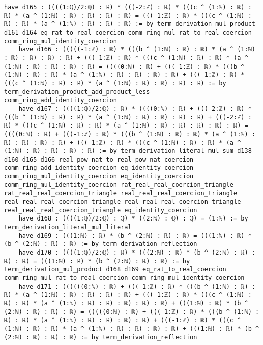 \documentclass{article}
\begin{document}
\begin{tcolorbox}[colback=white!10, width=\linewidth]
\begin{lstlisting}[language=Lean4]
    have d165 : ((((1:ℚ)/2:ℚ) : ℝ) * (((-2:ℤ) : ℝ) * (((c ^ (1:ℕ) : ℝ) : ℝ) * (a ^ (1:ℕ) : ℝ) : ℝ) : ℝ) : ℝ) = (((-1:ℤ) : ℝ) * (((c ^ (1:ℕ) : ℝ) : ℝ) * (a ^ (1:ℕ) : ℝ) : ℝ) : ℝ) := by term_derivation_mul_product d161 d164 eq_rat_to_real_coercion comm_ring_mul_rat_to_real_coercion comm_ring_mul_identity_coercion
    have d166 : (((((-1:ℤ) : ℝ) * (((b ^ (1:ℕ) : ℝ) : ℝ) * (a ^ (1:ℕ) : ℝ) : ℝ) : ℝ) : ℝ) + (((-1:ℤ) : ℝ) * (((c ^ (1:ℕ) : ℝ) : ℝ) * (a ^ (1:ℕ) : ℝ) : ℝ) : ℝ) : ℝ) = ((((0:ℕ) : ℝ) + (((-1:ℤ) : ℝ) * (((b ^ (1:ℕ) : ℝ) : ℝ) * (a ^ (1:ℕ) : ℝ) : ℝ) : ℝ) : ℝ) + (((-1:ℤ) : ℝ) * (((c ^ (1:ℕ) : ℝ) : ℝ) * (a ^ (1:ℕ) : ℝ) : ℝ) : ℝ) : ℝ) := by term_derivation_product_add_product_less comm_ring_add_identity_coercion
    have d167 : ((((1:ℚ)/2:ℚ) : ℝ) * ((((0:ℕ) : ℝ) + (((-2:ℤ) : ℝ) * (((b ^ (1:ℕ) : ℝ) : ℝ) * (a ^ (1:ℕ) : ℝ) : ℝ) : ℝ) : ℝ) + (((-2:ℤ) : ℝ) * (((c ^ (1:ℕ) : ℝ) : ℝ) * (a ^ (1:ℕ) : ℝ) : ℝ) : ℝ) : ℝ) : ℝ) = ((((0:ℕ) : ℝ) + (((-1:ℤ) : ℝ) * (((b ^ (1:ℕ) : ℝ) : ℝ) * (a ^ (1:ℕ) : ℝ) : ℝ) : ℝ) : ℝ) + (((-1:ℤ) : ℝ) * (((c ^ (1:ℕ) : ℝ) : ℝ) * (a ^ (1:ℕ) : ℝ) : ℝ) : ℝ) : ℝ) := by term_derivation_literal_mul_sum d138 d160 d165 d166 real_pow_nat_to_real_pow_nat_coercion comm_ring_add_identity_coercion eq_identity_coercion comm_ring_mul_identity_coercion eq_identity_coercion comm_ring_mul_identity_coercion rat_real_real_coercion_triangle rat_real_real_coercion_triangle real_real_real_coercion_triangle real_real_real_coercion_triangle real_real_real_coercion_triangle real_real_real_coercion_triangle eq_identity_coercion
    have d168 : ((((1:ℚ)/2:ℚ) : ℚ) * ((2:ℕ) : ℚ) : ℚ) = (1:ℕ) := by term_derivation_literal_mul_literal
    have d169 : (((1:ℕ) : ℝ) * (b ^ (2:ℕ) : ℝ) : ℝ) = (((1:ℕ) : ℝ) * (b ^ (2:ℕ) : ℝ) : ℝ) := by term_derivation_reflection
    have d170 : ((((1:ℚ)/2:ℚ) : ℝ) * (((2:ℕ) : ℝ) * (b ^ (2:ℕ) : ℝ) : ℝ) : ℝ) = (((1:ℕ) : ℝ) * (b ^ (2:ℕ) : ℝ) : ℝ) := by term_derivation_mul_product d168 d169 eq_rat_to_real_coercion comm_ring_mul_rat_to_real_coercion comm_ring_mul_identity_coercion
    have d171 : ((((((0:ℕ) : ℝ) + (((-1:ℤ) : ℝ) * (((b ^ (1:ℕ) : ℝ) : ℝ) * (a ^ (1:ℕ) : ℝ) : ℝ) : ℝ) : ℝ) + (((-1:ℤ) : ℝ) * (((c ^ (1:ℕ) : ℝ) : ℝ) * (a ^ (1:ℕ) : ℝ) : ℝ) : ℝ) : ℝ) : ℝ) + (((1:ℕ) : ℝ) * (b ^ (2:ℕ) : ℝ) : ℝ) : ℝ) = (((((0:ℕ) : ℝ) + (((-1:ℤ) : ℝ) * (((b ^ (1:ℕ) : ℝ) : ℝ) * (a ^ (1:ℕ) : ℝ) : ℝ) : ℝ) : ℝ) + (((-1:ℤ) : ℝ) * (((c ^ (1:ℕ) : ℝ) : ℝ) * (a ^ (1:ℕ) : ℝ) : ℝ) : ℝ) : ℝ) + (((1:ℕ) : ℝ) * (b ^ (2:ℕ) : ℝ) : ℝ) : ℝ) := by term_derivation_reflection

\end{lstlisting}
\end{tcolorbox}
\end{document}
